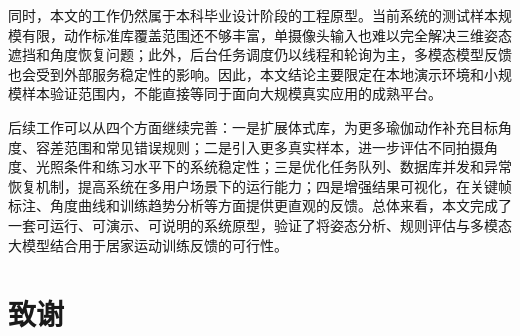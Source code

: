 \documentclass[UTF8,twoside]{ctexrep}
\makeatletter
\def@NAT@last@yr{\@citea}%
\def@NAT@last@yr{-\NAT@penalty}%
\makeatother
\begin{document}
同时，本文的工作仍然属于本科毕业设计阶段的工程原型。当前系统的测试样本规模有限，动作标准库覆盖范围还不够丰富，单摄像头输入也难以完全解决三维姿态遮挡和角度恢复问题；此外，后台任务调度仍以线程和轮询为主，多模态模型反馈也会受到外部服务稳定性的影响。因此，本文结论主要限定在本地演示环境和小规模样本验证范围内，不能直接等同于面向大规模真实应用的成熟平台。

后续工作可以从四个方面继续完善：一是扩展体式库，为更多瑜伽动作补充目标角度、容差范围和常见错误规则；二是引入更多真实样本，进一步评估不同拍摄角度、光照条件和练习水平下的系统稳定性；三是优化任务队列、数据库并发和异常恢复机制，提高系统在多用户场景下的运行能力；四是增强结果可视化，在关键帧标注、角度曲线和训练趋势分析等方面提供更直观的反馈。总体来看，本文完成了一套可运行、可演示、可说明的系统原型，验证了将姿态分析、规则评估与多模态大模型结合用于居家运动训练反馈的可行性。




\chapter*{致谢}
\end{document}
